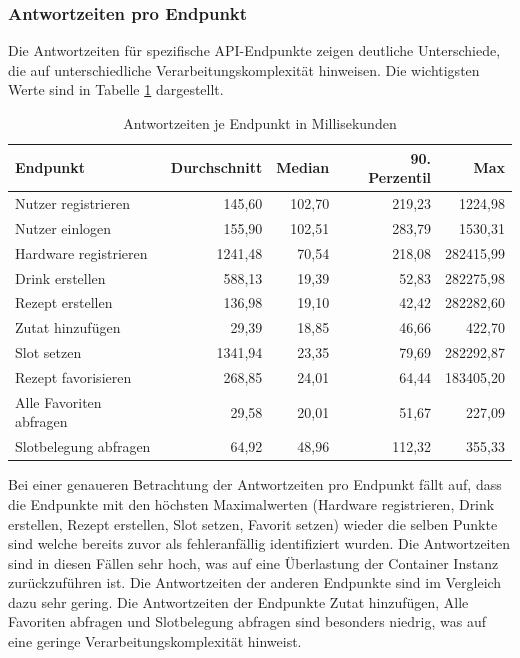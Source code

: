 \subsubsection*{Antwortzeiten pro Endpunkt}

Die Antwortzeiten für spezifische API-Endpunkte zeigen deutliche Unterschiede, die auf 
unterschiedliche Verarbeitungskomplexität hinweisen. Die wichtigsten Werte sind in Tabelle 
\ref{tab:response_times} dargestellt.

\begin{table}[H] 
    \centering
        \begin{tabular}{|l|r|r|r|r|}
            \hline
            \textbf{Endpunkt} &
            \textbf{Durchschnitt} & 
            \textbf{Median} & 
            \textbf{90. Perzentil} & 
            \textbf{Max} \\
            \hline
            Nutzer registrieren     &  145,60 & 102,70 & 219,23 &   1224,98 \\
            Nutzer einlogen         &  155,90 & 102,51 & 283,79 &   1530,31 \\
            Hardware registrieren   & 1241,48 &  70,54 & 218,08 & 282415,99 \\
            Drink erstellen         &  588,13 &  19,39 &  52,83 & 282275,98 \\
            Rezept erstellen        &  136,98 &  19,10 &  42,42 & 282282,60 \\
            Zutat hinzufügen        &   29,39 &  18,85 &  46,66 &    422,70 \\
            Slot setzen             & 1341,94 &  23,35 &  79,69 & 282292,87 \\
            Rezept favorisieren     &  268,85 &  24,01 &  64,44 & 183405,20 \\
            Alle Favoriten abfragen &   29,58 &  20,01 &  51,67 &    227,09 \\
            Slotbelegung abfragen   &   64,92 &  48,96 & 112,32 &    355,33 \\
            \hline
        \end{tabular}
    \caption{Antwortzeiten je Endpunkt in Millisekunden}
    \label{tab:response_times}
\end{table}

Bei einer genaueren Betrachtung der Antwortzeiten pro Endpunkt fällt auf, dass die Endpunkte mit 
den höchsten Maximalwerten (Hardware registrieren, Drink erstellen, Rezept erstellen, Slot setzen, 
Favorit setzen) wieder die selben Punkte sind welche bereits zuvor als fehleranfällig identifiziert
wurden. Die Antwortzeiten sind in diesen Fällen sehr hoch, was auf eine Überlastung der Container 
Instanz zurückzuführen ist. Die Antwortzeiten der anderen Endpunkte sind im Vergleich dazu sehr
gering. Die Antwortzeiten der Endpunkte Zutat hinzufügen, Alle Favoriten abfragen und Slotbelegung
abfragen sind besonders niedrig, was auf eine geringe Verarbeitungskomplexität hinweist.

